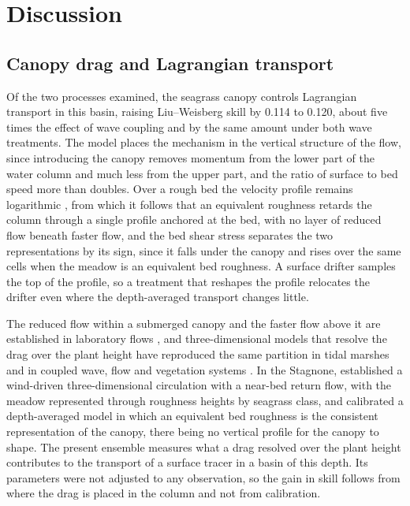 \section{Discussion}
\label{sec:discussion}

\subsection{Canopy drag and Lagrangian transport}

Of the two processes examined, the seagrass canopy controls Lagrangian
transport in this basin, raising Liu--Weisberg skill by 0.114 to 0.120, about
five times the effect of wave coupling and by the same amount under both wave
treatments. The model places the mechanism in the vertical structure of the
flow, since introducing the canopy removes momentum from the lower part of the
water column and much less from the upper part, and the ratio of surface to bed
speed more than doubles. Over a rough bed the velocity profile remains
logarithmic \citep{Nepf2012}, from which it follows that an equivalent
roughness retards the column through a single profile anchored at the bed,
with no layer of reduced flow beneath faster flow, and the bed shear stress
separates the two representations by its sign, since it falls under the canopy and rises over the same cells when
the meadow is an equivalent bed roughness. A surface drifter samples the top of
the profile, so a treatment that reshapes the profile relocates the drifter even
where the depth-averaged transport changes little.

The reduced flow within a submerged canopy and the faster flow above it are
established in laboratory flows \citep{NepfVivoni2000, Nepf2012}, and
three-dimensional models that resolve the drag over the plant height have
reproduced the same partition in tidal marshes \citep{Temmerman2005} and in
coupled wave, flow and vegetation systems \citep{Beudin2017}. In the Stagnone,
\citet{DeMarchis2012} established a wind-driven three-dimensional circulation
with a near-bed return flow, with the meadow represented through roughness
heights by seagrass class, and \citet{Ingrassia2024} calibrated a
depth-averaged model in which an equivalent bed roughness is the consistent
representation of the canopy, there being no vertical profile for the canopy
to shape. The present ensemble measures what a drag resolved over the plant
height contributes to the transport of a surface tracer in a basin of this
depth. Its parameters were not adjusted to any observation, so the gain in skill follows from where the drag is placed
in the column and not from calibration.

